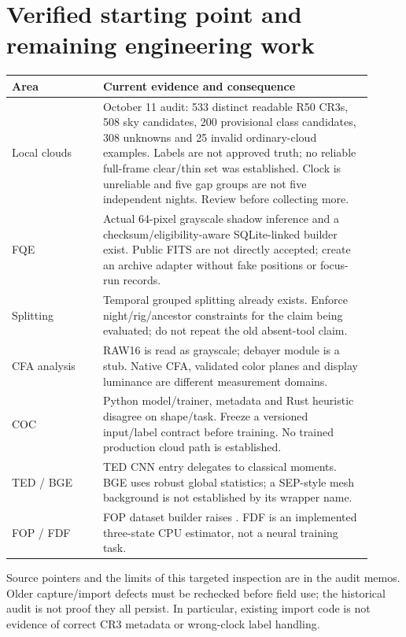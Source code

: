 \documentclass[11pt,a4paper]{article}
\newcommand{\code}[1]{\texttt{\detokenize{#1}}}
\begin{document}
\section{Verified starting point and remaining engineering work}
\begin{longtable}{@{}L{0.23\linewidth}L{0.68\linewidth}@{}}
\toprule Area & Current evidence and consequence\\\midrule\endhead
Local clouds & October 11 audit: 533 distinct readable R50 CR3s, 508 sky
candidates, 200 provisional class candidates, 308 unknowns and 25 invalid
ordinary-cloud examples. Labels are not approved truth; no reliable full-frame
clear/thin set was established. Clock is unreliable and five gap groups are
not five independent nights. Review before collecting more.\\
FQE & Actual 64-pixel grayscale shadow inference and a checksum/eligibility-aware
SQLite-linked builder exist. Public FITS are not directly accepted; create an
archive adapter without fake positions or focus-run records.\\
Splitting & Temporal grouped splitting already exists. Enforce night/rig/ancestor
constraints for the claim being evaluated; do not repeat the old absent-tool claim.\\
CFA analysis & RAW16 is read as grayscale; debayer module is a stub. Native CFA,
validated color planes and display luminance are different measurement domains.\\
COC & Python model/trainer, metadata and Rust heuristic disagree on shape/task.
Freeze a versioned input/label contract before training. No trained production
cloud path is established.\\
TED / BGE & TED CNN entry delegates to classical moments. BGE uses robust global
statistics; a SEP-style mesh background is not established by its wrapper name.\\
FOP / FDF & FOP dataset builder raises \code{NotImplementedError}. FDF is an
implemented three-state CPU estimator, not a neural training task.\\
\bottomrule
\end{longtable}
Source pointers and the limits of this targeted inspection are in the audit
memos. Older capture/import defects must be rechecked before field use; the
historical audit is not proof they all persist. In particular, existing import
code is not evidence of correct CR3 metadata or wrong-clock label handling.
\end{document}
